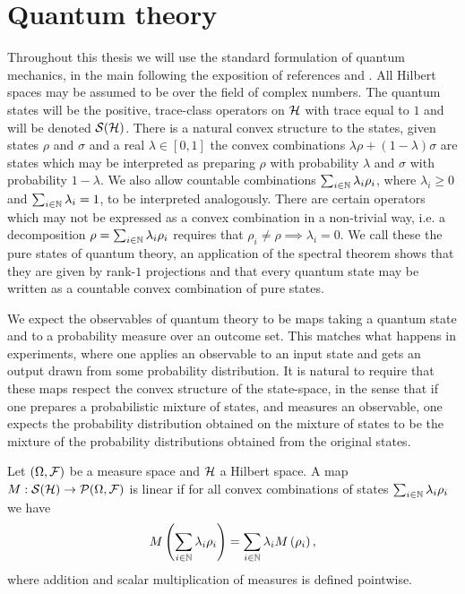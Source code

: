 \section{Quantum theory}


Throughout this thesis we will use the standard formulation of quantum mechanics, in the main following the exposition of references \cite{quantum-measurement-busch-et-al} and \cite{statistical-structure-quantum-holevo}. All Hilbert spaces may be assumed to be over the field of complex numbers. The quantum states will be the positive, trace-class operators on $\mathcal{H}$ with trace equal to $1$ and will be denoted $\dops[\hcal]$. There is a natural convex structure to the states, given states $\rho$ and $\sigma$ and a real $\lambda \in[0,1]$ the convex combinations $\lambda\rho + (1-\lambda)\sigma$ are states which may be interpreted as preparing $\rho$ with probability $\lambda$ and $\sigma$ with probability $1-\lambda$. We also allow countable combinations $\sum_{i\in\mathbb{N}}\lambda_i\rho_i$, where $\lambda_i \geq 0$ and $\sum_{i\in\mathbb{N}}\lambda_i = 1$, to be interpreted analogously. There are certain operators which may not be expressed as a convex combination in a non-trivial way, i.e. a decomposition $\rho = \sum_{i\in\mathbb{N}} \lambda_i\rho_i$ requires that $\rho_i\neq \rho \implies \lambda_i = 0$. We call these the pure states of quantum theory, an application of the spectral theorem shows that they are given by rank-$1$ projections and that every quantum state may be written as a countable convex combination of pure states.

We expect the observables of quantum theory to be maps taking a quantum state and to a probability measure over an outcome set. This matches what happens in experiments, where one applies an observable to an input state and gets an output drawn from some probability distribution. It is natural to require that these maps respect the convex structure of the state-space, in the sense that if one prepares a probabilistic mixture of states, and measures an observable, one expects the probability distribution obtained on the mixture of states to be the mixture of the probability distributions obtained from the original states. 
\begin{defn}
  Let $(\Omega,\mathcal{F})$ be a measure space and $\mathcal{H}$ a Hilbert space. A map $M:\dops[\hcal]\to\probs{\Omega}{\fcal}$ is linear if for all convex combinations of states $\sum_{i\in\mathbb{N}} \lambda_i \rho_i$ we have
  \begin{align}
    M\left(\sum_{i\in\mathbb{N}} \lambda_i \rho_i\right) = \sum_{i\in\mathbb{N}} \lambda_i M\left(\rho_i\right),
  \end{align}
  where addition and scalar multiplication of measures is defined pointwise.
\end{defn}

